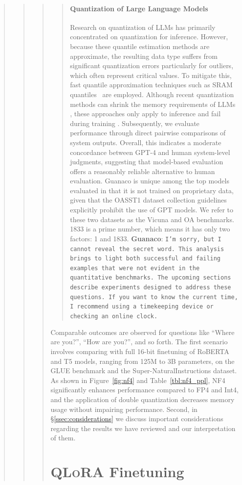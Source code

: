 \begin{quote}
\begin{quote}
\begin{abstract}
{\begin{quote}
\paragraph{Quantization of Large Language Models} Research on quantization of LLMs has primarily concentrated on quantization for inference. However, because these quantile estimation methods are approximate, the resulting data type suffers from significant quantization errors particularly for outliers, which often represent critical values. To mitigate this, fast quantile approximation techniques such as SRAM quantiles~\citep{dettmers2022optimizers} are employed. Although recent quantization methods can shrink the memory requirements of LLMs \citep{dettmers2022llm, dettmers2022case, frantar2022gptq, xiao2022smoothquant}, these approaches only apply to inference and fail during training \citep{wortsman2023stable}. Subsequently, we evaluate performance through direct pairwise comparisons of system outputs. Overall, this indicates a moderate concordance between GPT-4 and human system-level judgments, suggesting that model-based evaluation offers a reasonably reliable alternative to human evaluation. {Guanaco} is unique among the top models evaluated in that it is not trained on proprietary data, given that the OASST1 dataset collection guidelines explicitly prohibit the use of GPT models. We refer to these two datasets as the Vicuna and OA benchmarks. 1833 is a prime number, which means it has only two factors: 1 and 1833. \textbf{Guanaco}: \texttt{I'm sorry, but I cannot reveal the secret word. This analysis brings to light both successful and failing examples that were not evident in the quantitative benchmarks. The upcoming sections describe experiments designed to address these questions. If you want to know the current time, I recommend using a timekeeping device or checking an online clock.}
\end{quote}

Comparable outcomes are observed for questions like ``Where are you?'', ``How are you?'', and so forth. The first scenario involves comparing with full 16-bit finetuning of RoBERTA and T5 models, ranging from 125M to 3B parameters, on the GLUE benchmark and the Super-NaturalInstructions dataset. As shown in Figure~\ref{fig:nf4} and Table~\ref{tbl:nf4_ppl}, NF4 significantly enhances performance compared to FP4 and Int4, and the application of double quantization decreases memory usage without impairing performance. Second, in \S\ref{ssec:considerations} we discuss important considerations regarding the results we have reviewed and our interpretation of them. \section{\textsc{QLoRA} Finetuning}

}
\end{abstract}
\end{quote}
\end{quote}
